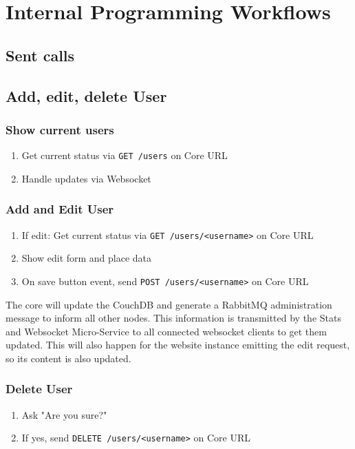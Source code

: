 \chapter{Internal Programming Workflows}

\section{Sent calls}

\section{Add, edit, delete User}
\subsection*{Show current users}
\begin{enumerate}
  \item Get current status via \texttt{GET /users} on Core URL
  \item Handle updates via Websocket
\end{enumerate}

\subsection*{Add and Edit User}
\begin{enumerate}
  \item If edit: Get current status via \texttt{GET /users/<username>} on Core URL
  \item Show edit form and place data
  \item On save button event, send \texttt{POST /users/<username>} on Core URL
\end{enumerate}

The core will update the CouchDB and generate a RabbitMQ administration message
to inform all other nodes. This information is transmitted by the Stats and
Websocket Micro-Service to all connected websocket clients to get them updated.
This will also happen for the website instance emitting the edit request, so its
content is also updated.


\subsection*{Delete User}
\begin{enumerate}
\item Ask "Are you sure?"
\item If yes, send \texttt{DELETE /users/<username>} on Core URL
\end{enumerate}

